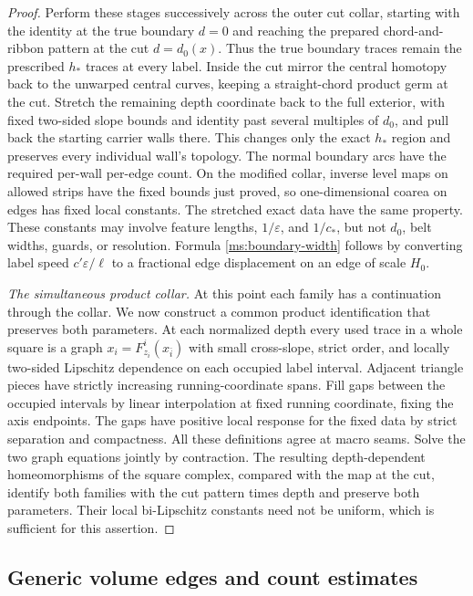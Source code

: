 \begin{proof}
Perform these stages successively across the outer cut collar, starting
with the identity at the true boundary $d=0$ and reaching the prepared
chord-and-ribbon pattern at the cut $d=d_0(x)$.  Thus the true boundary
traces remain the prescribed $h_*$ traces at every label.
Inside the cut mirror
the central homotopy back to the unwarped central curves, keeping a
straight-chord product germ at the cut.  Stretch the remaining depth
coordinate back to the full exterior, with fixed two-sided slope
bounds and identity past several multiples of $d_0$, and pull back
the starting carrier walls there.  This changes only the exact
$h_*$ region and preserves every individual wall's topology.
The normal boundary arcs have the required per-wall per-edge count.
On the modified collar, inverse level maps on allowed strips have
the fixed bounds just proved, so one-dimensional coarea on edges
has fixed local constants.  The stretched exact data have the same
property.  These constants may involve feature lengths,
$1/\varepsilon$, and $1/c_*$, but not $d_0$, belt widths, guards, or
resolution.  Formula \eqref{ms:boundary-width} follows by converting
label speed $c'\varepsilon/\ell$ to a fractional edge displacement
on an edge of scale $H_0$.

\emph{The simultaneous product collar.}
At this point each family has a continuation through the collar.  We
now construct a common product identification that preserves both
parameters.  At each normalized depth every used trace
in a whole square is a graph
$x_i=F^i_{z_i}(x_{\bar i})$ with small cross-slope, strict order,
and locally two-sided Lipschitz dependence on each occupied label
interval.  Adjacent triangle pieces have strictly increasing
running-coordinate spans.  Fill gaps between the occupied intervals
by linear interpolation at fixed running coordinate, fixing the
axis endpoints.  The gaps have positive local response for the
fixed data by strict separation and compactness.  All these
definitions agree at macro seams.  Solve the two graph equations
jointly by contraction.  The resulting depth-dependent
homeomorphisms of the square complex, compared with the map at the
cut, identify both families with the cut pattern times depth and
preserve both parameters.  Their local bi-Lipschitz constants need
not be uniform, which is sufficient for this assertion.
\end{proof}

\subsection{Generic volume edges and count estimates}

